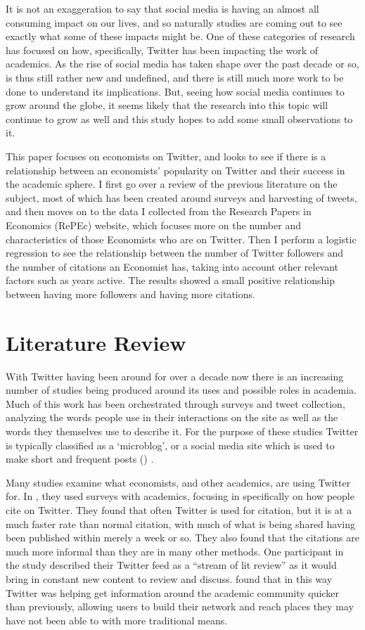 \documentclass[12pt, Times New Roman]{article}
\begin{document}
It is not an exaggeration to say that social media is having an almost all consuming impact on our lives, and so naturally studies are coming out to see exactly what some of these impacts might be. One of these categories of research has focused on how, specifically, Twitter has been impacting the work of academics. As the rise of social media has taken shape over the past decade or so, is thus still rather new and undefined, and there is still much more work to be done to understand its implications. But, seeing how social media continues to grow around the globe, it seems likely that the research into this topic will continue to grow as well and this study hopes to add some small observations to it. 

This paper focuses on economists on Twitter, and looks to see if there is a relationship between an economists' popularity on Twitter and their success in the academic sphere. I first go over a review of the previous literature on the subject, most of which has been created around surveys and harvesting of tweets, and then moves on to the data I collected from the Research Papers in Economics (RePEc) website, which focuses more on the number and characteristics of those Economists who are on Twitter. Then I perform a logistic regression to see the relationship between the number of Twitter followers and the number of citations an Economist has, taking into account other relevant factors such as years active. The results showed a small positive relationship between having more followers and having more citations.



\section*{Literature Review}\label{sec:litreview}

With Twitter having been around for over a decade now there is an increasing number of studies being produced around its uses and possible roles in academia. Much of this work has been orchestrated through surveys and tweet collection, analyzing the words people use in their interactions on the site as well as the words they themselves use to describe it. For the purpose of these studies Twitter is typically classified as a ‘microblog’, or a social media site which is used to make short and frequent posts (\citet{Gerstein}) .

Many studies examine what economists, and other academics, are using Twitter for. In \citet{Priem}, they used surveys with academics, focusing in specifically on how people cite on Twitter. They found that often Twitter is used for citation, but it is at a much faster rate than normal citation, with much of what is being shared having been published within merely a week or so. They also found that the citations are much more informal than they are in many other methods. One participant in the study described their Twitter feed as a “stream of lit review” as it would bring in constant new content to review and discuss. \citet{Priem} found that in this way Twitter was helping get information around the academic community quicker than previously, allowing users to build their network and reach places they may have not been able to with more traditional means. 
\end{document}
